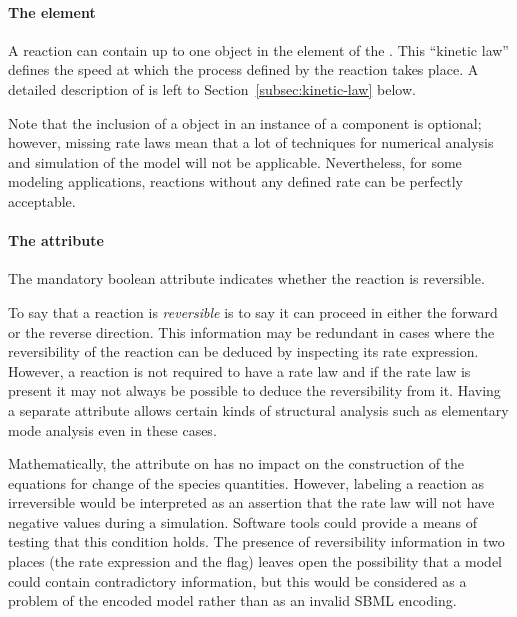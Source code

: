 \paragraph{The  element}

A reaction can contain up to one \KineticLaw object in the
 element of the \Reaction.  This ``kinetic law''
defines the speed at which the process defined by the reaction
takes place.  A detailed description of \KineticLaw is left to
Section~\ref{subsec:kinetic-law} below.

Note that the inclusion of a \KineticLaw object in an instance
of a \Reaction component is optional; however, missing rate laws mean
that a lot of techniques for numerical analysis and simulation of the 
model will not be applicable. 
Nevertheless, for some modeling applications,
reactions without any defined rate can be perfectly acceptable.


\paragraph{The  attribute}
\label{sec:reversible}

The mandatory boolean attribute  indicates whether
the reaction is reversible.  

To say that a reaction is \emph{reversible} is to say it can
proceed in either the forward or the reverse direction.
This information may be redundant in cases where the reversibility of the 
reaction can be deduced by inspecting its rate expression. However, a reaction
is not required to have a rate law and if the rate law is present it may not
always be possible to deduce the reversibility from it. 
Having a separate attribute allows certain kinds of structural analysis such as 
elementary mode analysis even in these cases.

Mathematically, the  attribute on \Reaction has no impact on 
the construction of the equations for change of the species quantities. However, 
labeling a reaction as irreversible would be interpreted as an assertion that 
the rate law will not have negative values during a simulation. 
Software tools could provide a means of testing that this condition holds.  
The presence of reversibility information in two places (\ie the rate expression
and the  flag) leaves open the possibility that
a model could contain contradictory information, but this would be considered as
a problem of the encoded model rather than as an invalid SBML encoding.

